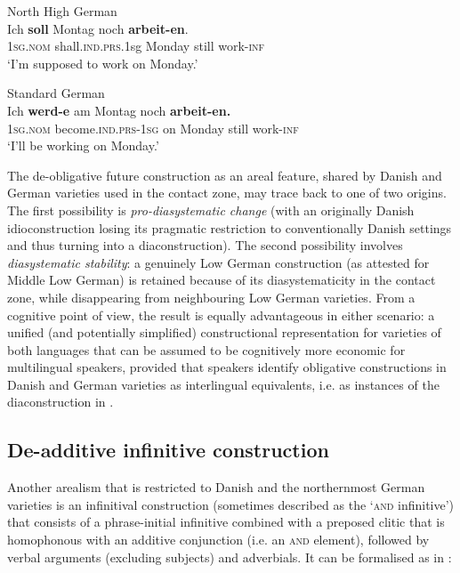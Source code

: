 \documentclass[output=paper]{langsci/langscibook}
\begin{document}
 	\ex\label{ex:hoeder:5c}
	North High German\\
	\gll Ich \textbf{soll} Montag noch \textbf{arbeit-en}.\\
     1\textsc{sg.nom} shall.\textsc{ind.prs}.1sg Monday still work-\textsc{inf}\\
	\glt `I’m supposed to work on Monday.'

	\ex\label{ex:hoeder:5d}
	 Standard German\\
	\gll Ich \textbf{werd-e} am{} Montag noch \textbf{arbeit-en.}\\
     1\textsc{sg.nom} become.\textsc{ind.prs}{}-1\textsc{sg} on Monday still work-\textsc{inf}\\
	\glt `I’ll be working on Monday.'
	\z
\z

The de-obligative future construction as an areal feature, shared by Danish and German varieties used in the contact zone, may trace back to one of two origins. The first possibility is \textit{pro-diasystematic change} (with an originally Danish idioconstruction losing its pragmatic restriction to conventionally Danish settings and thus turning into a diaconstruction). The second possibility involves \textit{diasystematic stability}: a genuinely Low German construction (as attested for Middle Low German) is retained because of its diasystematicity in the contact zone, while disappearing from neighbouring Low German varieties. From a cognitive point of view, the result is equally advantageous in either scenario: a unified (and potentially simplified) constructional representation for varieties of both languages that can be assumed to be cognitively more economic for multilingual speakers, provided that speakers identify obligative constructions in Danish and German varieties as interlingual equivalents, i.e. as instances of the diaconstruction in .


 
\subsection{De-additive infinitive construction}\label{sec:hoeder:4.3}
Another arealism that is restricted to Danish and the northernmost German varieties is an infinitival construction (sometimes described as the ‘\textsc{and} infinitive’) that consists of a phrase-initial infinitive combined with a preposed clitic that is homophonous with an additive conjunction (i.e. an \textsc{and} element), followed by verbal arguments (excluding subjects) and adverbials. It can be formalised as in :
\end{document}
